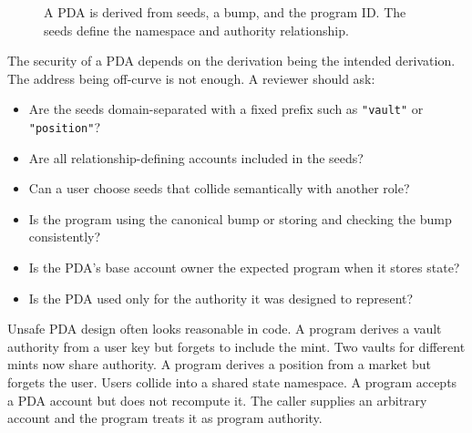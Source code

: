 \begin{figure}[htbp]
\centering
{}
\caption{A PDA is derived from seeds, a bump, and the program ID. The seeds define the namespace and authority relationship.}
\end{figure}

The security of a PDA depends on the derivation being the intended derivation. The address being off-curve is not enough. A reviewer should ask:

\begin{itemize}
\item Are the seeds domain-separated with a fixed prefix such as \texttt{"vault"} or \texttt{"position"}?
\item Are all relationship-defining accounts included in the seeds?
\item Can a user choose seeds that collide semantically with another role?
\item Is the program using the canonical bump or storing and checking the bump consistently?
\item Is the PDA's base account owner the expected program when it stores state?
\item Is the PDA used only for the authority it was designed to represent?
\end{itemize}

Unsafe PDA design often looks reasonable in code. A program derives a vault authority from a user key but forgets to include the mint. Two vaults for different mints now share authority. A program derives a position from a market but forgets the user. Users collide into a shared state namespace. A program accepts a PDA account but does not recompute it. The caller supplies an arbitrary account and the program treats it as program authority.

